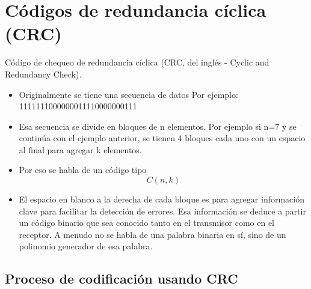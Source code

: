 \section{Códigos de redundancia cíclica (CRC)}

Código de chequeo de redundancia cíclica (CRC, del inglés - Cyclic and Redundancy Check).

\begin{itemize}
    \item Originalmente se tiene una secuencia de datos Por ejemplo: 1111111000000011110000000111
    \item Esa secuencia se divide en bloques de n elementos. Por ejemplo si n=7 y se continúa con el ejemplo anterior, se tienen 4 bloques cada uno con un espacio al final para agregar k elementos.


	\begin{table}[h!]
	    \captionsetup{justification = raggedright,singlelinecheck = false}
		\caption{Alguna descripción.}
		\label{tabla:tabla14}
				\centering
	\end{table}
	
    \item  Por eso se habla de un código tipo
        \begin{equation} \label{capsiete_veintiseis}
C(n,k)
    \end{equation}
    \item  El espacio en blanco a la derecha de cada bloque es para agregar información clave para facilitar la detección de errores. Esa información se deduce a partir un código binario que sea conocido tanto en el transmisor como en el receptor. A menudo no se habla de una palabra binaria en sí, sino de un polinomio generador de esa palabra.
\end{itemize}

\subsection {Proceso de codificación usando CRC}

